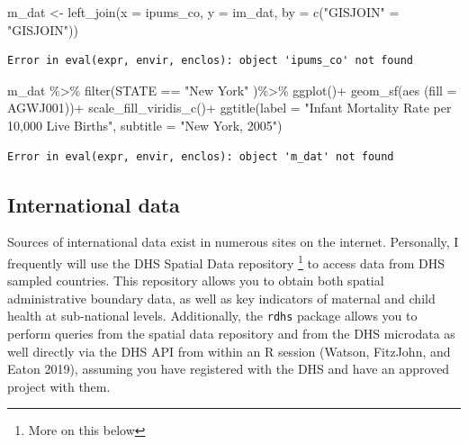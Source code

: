\documentclass[
  letterpaper,
  DIV=11,
  numbers=noendperiod]{scrreprt}
\newenvironment{Shaded}{\begin{snugshade}}{\end{snugshade}}
\newcommand{\AttributeTok}[1]{\textcolor[rgb]{0.40,0.45,0.13}{#1}}
\newcommand{\FunctionTok}[1]{\textcolor[rgb]{0.28,0.35,0.67}{#1}}
\newcommand{\NormalTok}[1]{\textcolor[rgb]{0.00,0.23,0.31}{#1}}
\newcommand{\OtherTok}[1]{\textcolor[rgb]{0.00,0.23,0.31}{#1}}
\newcommand{\SpecialCharTok}[1]{\textcolor[rgb]{0.37,0.37,0.37}{#1}}
\newcommand{\StringTok}[1]{\textcolor[rgb]{0.13,0.47,0.30}{#1}}
\begin{document}
\begin{Shaded}
\begin{Highlighting}[]
\NormalTok{m\_dat }\OtherTok{\textless{}{-}} \FunctionTok{left\_join}\NormalTok{(}\AttributeTok{x =}\NormalTok{ ipums\_co,}
                   \AttributeTok{y =}\NormalTok{ im\_dat,}
                   \AttributeTok{by =} \FunctionTok{c}\NormalTok{(}\StringTok{"GISJOIN"} \OtherTok{=} \StringTok{"GISJOIN"}\NormalTok{))}
\end{Highlighting}
\end{Shaded}

\begin{verbatim}
Error in eval(expr, envir, enclos): object 'ipums_co' not found
\end{verbatim}

\begin{Shaded}
\begin{Highlighting}[]
\NormalTok{m\_dat }\SpecialCharTok{\%\textgreater{}\%}
  \FunctionTok{filter}\NormalTok{(STATE }\SpecialCharTok{==} \StringTok{"New York"}\NormalTok{ )}\SpecialCharTok{\%\textgreater{}\%}
  \FunctionTok{ggplot}\NormalTok{()}\SpecialCharTok{+}
  \FunctionTok{geom\_sf}\NormalTok{(}\FunctionTok{aes}\NormalTok{ (}\AttributeTok{fill =}\NormalTok{ AGWJ001))}\SpecialCharTok{+}
  \FunctionTok{scale\_fill\_viridis\_c}\NormalTok{()}\SpecialCharTok{+}
  \FunctionTok{ggtitle}\NormalTok{(}\AttributeTok{label =} \StringTok{"Infant Mortality Rate per 10,000 Live Births"}\NormalTok{,}
          \AttributeTok{subtitle =} \StringTok{"New York, 2005"}\NormalTok{)}
\end{Highlighting}
\end{Shaded}

\begin{verbatim}
Error in eval(expr, envir, enclos): object 'm_dat' not found
\end{verbatim}

\hypertarget{international-data}{%
\subsection{International data}\label{international-data}}

Sources of international data exist in numerous sites on the internet.
Personally, I frequently will use the DHS Spatial Data repository
\footnote{More on this below} to access data from DHS sampled countries.
This repository allows you to obtain both spatial administrative
boundary data, as well as key indicators of maternal and child health at
sub-national levels. Additionally, the \texttt{rdhs} package allows you
to perform queries from the spatial data repository and from the DHS
microdata as well directly via the DHS API from within an R session
(Watson, FitzJohn, and Eaton 2019), assuming you have registered with
the DHS and have an approved project with them.
\end{document}
